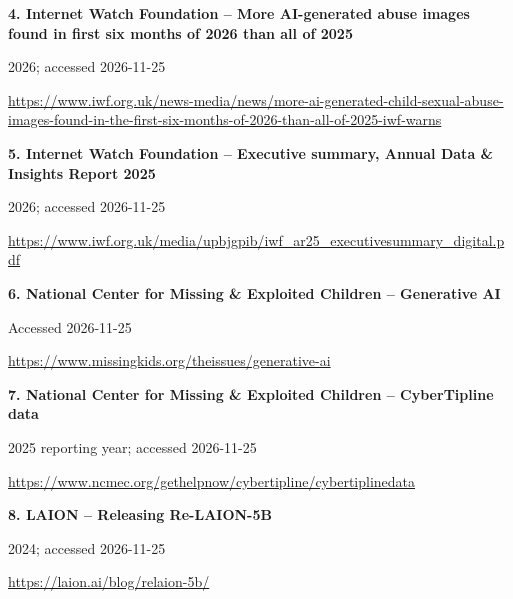 \documentclass[11pt,a4paper]{article}
\begin{document}
\noindent\begin{minipage}{\linewidth}\textbf{4. Internet Watch Foundation -- More AI-generated abuse images found in first six months of 2026 than all of 2025}\par{\small 2026; accessed 2026-11-25\par\url{https://www.iwf.org.uk/news-media/news/more-ai-generated-child-sexual-abuse-images-found-in-the-first-six-months-of-2026-than-all-of-2025-iwf-warns}}\par
\end{minipage}\par\vspace{2mm}
\noindent\begin{minipage}{\linewidth}\textbf{5. Internet Watch Foundation -- Executive summary, Annual Data \& Insights Report 2025}\par{\small 2026; accessed 2026-11-25\par\url{https://www.iwf.org.uk/media/upbjgpib/iwf_ar25_executivesummary_digital.pdf}}\par
\end{minipage}\par\vspace{2mm}
\noindent\begin{minipage}{\linewidth}\textbf{6. National Center for Missing \& Exploited Children -- Generative AI}\par{\small Accessed 2026-11-25\par\url{https://www.missingkids.org/theissues/generative-ai}}\par
\end{minipage}\par\vspace{2mm}
\noindent\begin{minipage}{\linewidth}\textbf{7. National Center for Missing \& Exploited Children -- CyberTipline data}\par{\small 2025 reporting year; accessed 2026-11-25\par\url{https://www.ncmec.org/gethelpnow/cybertipline/cybertiplinedata}}\par
\end{minipage}\par\vspace{2mm}
\noindent\begin{minipage}{\linewidth}\textbf{8. LAION -- Releasing Re-LAION-5B}\par{\small 2024; accessed 2026-11-25\par\url{https://laion.ai/blog/relaion-5b/}}\par
\end{minipage}\par\vspace{2mm}
\end{document}
